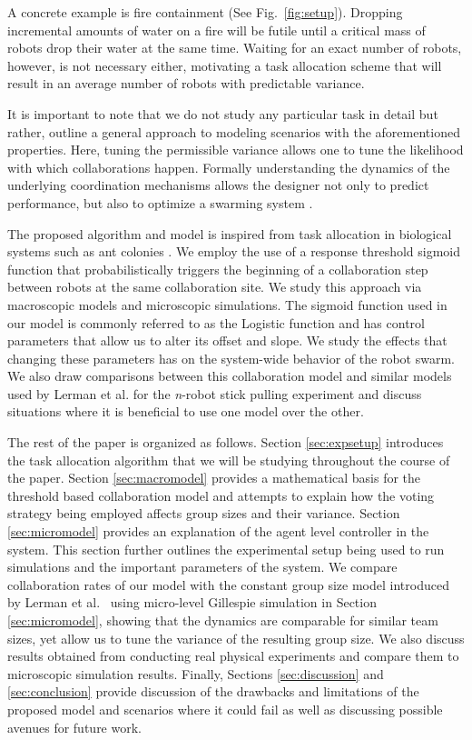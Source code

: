 \documentclass{TeXstyles/DARS/svmult}  %
\begin{document}
A concrete example is fire containment (See Fig.~\ref{fig:setup}). Dropping incremental amounts of water on a fire will be futile until a critical mass of robots drop their water at the same time. Waiting for an exact number of robots, however, is not necessary either, motivating a task allocation scheme that will result in an average number of robots with predictable variance. 

It is important to note that we do not study any particular task in detail but rather, outline a general approach to modeling scenarios with the aforementioned properties. Here, tuning the permissible variance allows one to tune the likelihood with which collaborations happen. Formally understanding the dynamics of the underlying coordination mechanisms allows the designer not only to predict performance, but also to optimize a swarming system \cite{Correll2008}.  

The proposed algorithm and model is inspired from task allocation in biological systems such as ant colonies \cite{Bonabeau1999,Krieger2000}. We employ the use of a response threshold sigmoid function that probabilistically triggers the beginning of a collaboration step between robots at the same collaboration site. We study this approach via macroscopic models and microscopic simulations. The sigmoid function used in our model is commonly referred to as the Logistic function and has control parameters that allow us to alter its offset and slope. We study the effects that changing these parameters has on the system-wide behavior of the robot swarm. We also draw comparisons between this collaboration model and similar models used by Lerman et al. for the \emph{n}-robot stick pulling experiment \cite{Lerman2001} and discuss situations where it is beneficial to use one model over the other.

The rest of the paper is organized as follows. Section \ref{sec:expsetup} introduces the task allocation algorithm that we will be studying throughout the course of the paper.
Section \ref{sec:macromodel} provides a mathematical basis for the threshold based collaboration model and attempts to explain how the voting strategy being employed affects group sizes and their variance.
Section \ref{sec:micromodel} provides an explanation of the agent level controller in the system. This section further outlines the experimental setup being used to run simulations and the important parameters of the system. 
We compare collaboration rates of our model with the constant group size model introduced by Lerman et al.~\cite{Lerman2001} using micro-level Gillespie simulation in Section \ref{sec:micromodel}, showing that the dynamics are comparable for similar team sizes, yet allow us to tune the variance of the resulting group size. We also discuss results obtained from conducting real physical experiments and compare them to microscopic simulation results. Finally, Sections \ref{sec:discussion} and \ref{sec:conclusion} provide discussion of the drawbacks and limitations of the proposed model and scenarios where it could fail as well as discussing possible avenues for future work.
\end{document}
